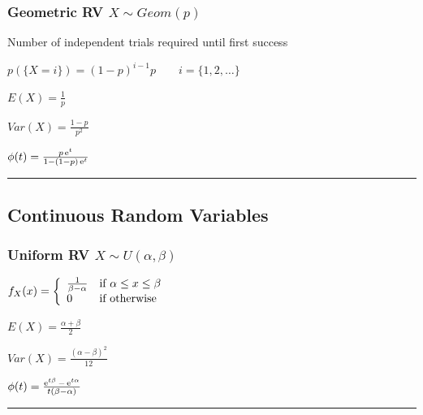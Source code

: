 \subsubsection{Geometric RV $X\sim Geom(p)$}

\begin{minipage}{10cm}
	\begin{liste}
		\item Number of independent trials required until first success
		\vspace{0.2cm}
		\item $\boxed{p(\{X=i\}) = (1-p)^{i-1}p\qquad i=\{1,2,\ldots\}}$
	\end{liste}
\end{minipage}
\hfill
\begin{minipage}{8cm}
	\begin{liste}
		\item $E(X)=\frac 1p$
		\item $Var(X)=\frac {1-p}{p^2}$
		\item $\phi(t)=\frac{p\operatorname{\mathrm e}^t}{1-(1-p)\operatorname{\mathrm e}^t}$
	\end{liste}
\end{minipage}
\hfill

\vspace{2mm}
\hrule
\vspace{3mm}

\subsection{Continuous Random Variables }
\subsubsection{Uniform RV $X\sim U(\alpha,\beta)$ }
\begin{minipage}{10cm}
$f_X(x) = \left\{ \begin{array}{ll}  \frac{1}{\beta-\alpha}  & \mbox{if } \alpha \leq x \leq\beta \\ 0 & \mbox{if } \text{otherwise} \end{array} \right.$
\end{minipage}
\begin{minipage}{10cm}
	\begin{liste}
		\item $E(X)=\frac {\alpha+\beta}{2}$
		\item $Var(X)=\frac {(\alpha-\beta)^2}{12}$
		\item $\phi(t)=\frac{\operatorname{\mathrm e}^{t\beta}-\operatorname{\mathrm e}^{t\alpha}}{t(\beta-\alpha)}$
	\end{liste}
\end{minipage}
\hfill
\vspace{2mm}
\hrule
\vspace{3mm}

